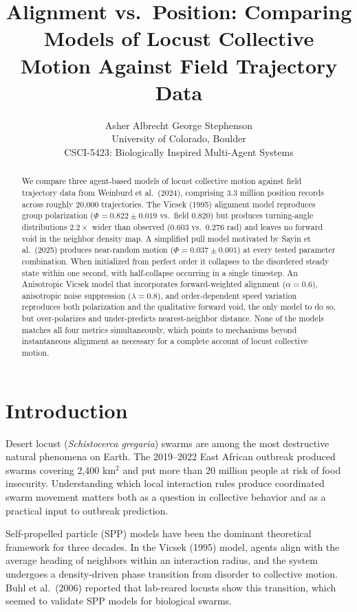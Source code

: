 \documentclass[11pt]{article}
\title{\vspace{-3em}\bfseries Alignment vs.\ Position: Comparing Models of Locust Collective Motion Against Field Trajectory Data}
\author{Asher Albrecht \quad George Stephenson \\[0.4em]
        \small University of Colorado, Boulder \\
        \small CSCI-5423: Biologically Inspired Multi-Agent Systems}
\date{}
\begin{document}
\maketitle
\vspace{-2.5em}

\begin{abstract}
\noindent
We compare three agent-based models of locust collective motion against field trajectory data from Weinburd et al.\ (2024), comprising 3.3 million position records across roughly 20{,}000 trajectories. The Vicsek (1995) alignment model reproduces group polarization ($\Phi = 0.822 \pm 0.019$ vs.\ field $0.820$) but produces turning-angle distributions $2.2\times$ wider than observed (0.603 vs.\ 0.276 rad) and leaves no forward void in the neighbor density map. A simplified pull model motivated by Sayin et al.\ (2025) produces near-random motion ($\Phi = 0.037 \pm 0.001$) at every tested parameter combination. When initialized from perfect order it collapses to the disordered steady state within one second, with half-collapse occurring in a single timestep. An Anisotropic Vicsek model that incorporates forward-weighted alignment ($\alpha = 0.6$), anisotropic noise suppression ($\lambda = 0.8$), and order-dependent speed variation reproduces both polarization and the qualitative forward void, the only model to do so, but over-polarizes and under-predicts nearest-neighbor distance. None of the models matches all four metrics simultaneously, which points to mechanisms beyond instantaneous alignment as necessary for a complete account of locust collective motion.
\end{abstract}

\section{Introduction}

Desert locust (\emph{Schistocerca gregaria}) swarms are among the most destructive natural phenomena on Earth. The 2019--2022 East African outbreak produced swarms covering 2{,}400 km$^2$ and put more than 20 million people at risk of food insecurity. Understanding which local interaction rules produce coordinated swarm movement matters both as a question in collective behavior and as a practical input to outbreak prediction.

Self-propelled particle (SPP) models have been the dominant theoretical framework for three decades. In the Vicsek (1995) model, agents align with the average heading of neighbors within an interaction radius, and the system undergoes a density-driven phase transition from disorder to collective motion. Buhl et al.\ (2006) reported that lab-reared locusts show this transition, which seemed to validate SPP models for biological swarms.
\end{document}
